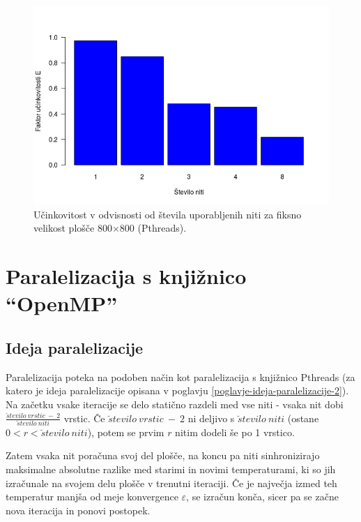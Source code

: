 \documentclass[a4paper,titlepage,11pt]{article}
\begin{document}
\begin{figure}[H]
\begin{center}
\includegraphics[scale=0.55]{graf-rezultati-2_3.png}
\caption{Učinkovitost v odvisnosti od števila uporabljenih niti za fiksno velikost plošče 800$\times$800 (Pthreads).}
\label{graf-rezultati-ucinkovitost-2}
\end{center}
\vspace{-25pt}
\end{figure}

\pagebreak

\section{Paralelizacija s knjižnico ``OpenMP''}
\label{poglavje-openmp}

\subsection{Ideja paralelizacije}
Paralelizacija poteka na podoben način kot paralelizacija s knjižnico Pthreads (za katero je ideja paralelizacije opisana v poglavju \ref{poglavje-ideja-paralelizacije-2}). Na začetku vsake iteracije se delo statično razdeli med vse niti - vsaka nit dobi $\frac{\breve{s}tevilo \ vrstic \ - \ 2}{\breve{s}tevilo \ niti}$ vrstic. Če $\breve{s}tevilo \ vrstic \ - \ 2$ ni deljivo s $\breve{s}tevilo \ niti$ (ostane $0 < r < \breve{s}tevilo \ niti$), potem se prvim $r$ nitim dodeli še po 1 vrstico.

Zatem vsaka nit poračuna svoj del plošče, na koncu pa niti sinhronizirajo maksimalne absolutne razlike med starimi in novimi temperaturami, ki so jih izračunale na svojem delu plošče v trenutni iteraciji. Če je največja izmed teh temperatur manjša od meje konvergence $\varepsilon$, se izračun konča, sicer pa se začne nova iteracija in ponovi postopek.
\end{document}
